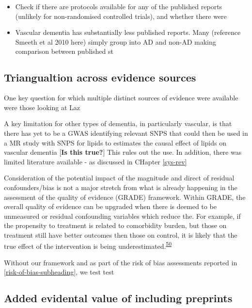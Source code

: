 \documentclass[a4paper, twoside]{templates/ociamthesis}
\providecommand{\tightlist}{%
  \setlength{\itemsep}{0pt}\setlength{\parskip}{0pt}}
\begin{document}
\begin{itemize}
\tightlist
\item
  Check if there are protocols available for any of the published reports (unlikely for non-randomised controlled trials), and whether there were
\item
  Vascular dementia has substantially less published reports. Many (reference Smeeth et al 2010 here) simply group into AD and non-AD making comparison between published st
\end{itemize}

\hypertarget{triangualtion-across-evidence-sources}{%
\subsection{Triangualtion across evidence sources}\label{triangualtion-across-evidence-sources}}

One key question for which multiple distinct sources of evidence were available were those looking at Laz

A key limitation for other types of dementia, in particularly vascular, is that there has yet to be a GWAS identifying relevant SNPS that could then be used in a MR study with SNPS for lipids to estimates the causal effect of lipids on vascular dementia {[}\textbf{Is this true?}{]} This rules out the use. In addition, there was limited literature available - as discussed in CHapter \ref{sys-rev}

Consideration of the potential impact of the magnitude and direct of residual confounders/bias is not a major stretch from what is already happening in the assessment of the quality of evidence (GRADE) framework. Within GRADE, the overall quality of evidence can be upgraded when there is deemed to be unmeasured or residual confounding variables which reduce the. For example, if the propensity to treatment is related to comorbidity burden, but those on treatment still have better outcomes then those on control, it is likely that the true effect of the intervention is being underestimated.\textsuperscript{\protect\hyperlink{ref-guyatt2011}{50}}

Without our framework and as part of the risk of bias assessments reported in \ref{risk-of-bias-subheading}, we test test

\hypertarget{added-evidental-value-of-including-preprints}{%
\subsection{Added evidental value of including preprints}\label{added-evidental-value-of-including-preprints}}
\end{document}
